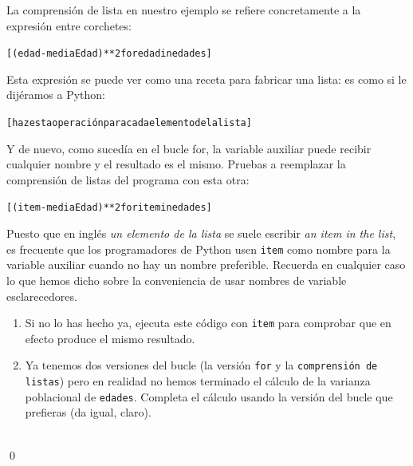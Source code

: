 \documentclass[10pt,a4paper]{article}\usepackage[]{graphicx}\usepackage[]{color}
\makeatletter
\newenvironment{kframe}{%
 \def\at@end@of@kframe{}%
 \ifinner\ifhmode%
  \def\at@end@of@kframe{\end{minipage}}%
  \begin{minipage}{\columnwidth}%
 \fi\fi%
 \def\FrameCommand##1{\hskip\@totalleftmargin \hskip-\fboxsep
 \colorbox{shadecolor}{##1}\hskip-\fboxsep
     \hskip-\linewidth \hskip-\@totalleftmargin \hskip\columnwidth}%
 \MakeFramed {\advance\hsize-\width
   \@totalleftmargin\z@ \linewidth\hsize
   \@setminipage}}%
 {\par\unskip\endMakeFramed%
 \at@end@of@kframe}
\newenvironment{knitrout}{}{} %
\makeatother
\begin{document}
La comprensión de lista en nuestro ejemplo se refiere concretamente a la expresión entre corchetes:
\begin{knitrout}
\color{fgcolor}\begin{kframe}
\begin{alltt}
[(edad - mediaEdad)**2 for edad in edades]
\end{alltt}
\end{kframe}
\end{knitrout}
Esta expresión se puede ver como una receta para fabricar una lista: es como si le dijéramos a Python:
\begin{knitrout}
\color{fgcolor}\begin{kframe}
\begin{alltt}
[haz esta operación para cada elemento de la lista]
\end{alltt}
\end{kframe}
\end{knitrout}
Y de nuevo, como sucedía en el bucle for, la variable auxiliar puede recibir cualquier nombre y el resultado es el mismo. Pruebas a reemplazar la comprensión de listas del programa con esta otra:
\begin{knitrout}
\color{fgcolor}\begin{kframe}
\begin{alltt}
[(item - mediaEdad)**2 for item in edades]
\end{alltt}
\end{kframe}
\end{knitrout}
Puesto que en inglés {\em un elemento de la lista} se suele escribir {\em an item in the list}, es frecuente que los programadores de Python usen {\tt item} como nombre para la variable auxiliar cuando no hay un nombre preferible. Recuerda en cualquier caso lo que hemos dicho sobre la conveniencia de usar nombres de variable esclarecedores.

\begin{ejercicio}
\label{tut02:ejercicio16}
\quad
\begin{enumerate}
\item Si no lo has hecho ya, ejecuta este código con {\tt item} para comprobar que en efecto produce el mismo resultado.
\item Ya tenemos dos versiones del bucle (la versión {\tt for} y la {\tt comprensión de listas}) pero en realidad no hemos terminado el cálculo de la  varianza poblacional de {\tt edades}. Completa el cálculo usando la versión del bucle que prefieras (da igual, claro).
\end{enumerate}
\quad\\
\qed
\end{ejercicio}
\end{document}
